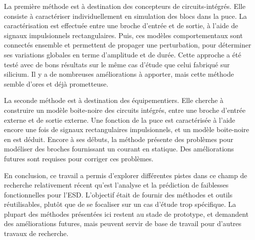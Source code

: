 La première méthode est à destination des concepteurs de circuits-intégrés.
Elle consiste à caractériser individuellement en simulation des blocs dans la puce.
La caractérisation est effectuée entre une broche d'entrée et de sortie, à l'aide de signaux impulsionnels rectangulaires.
Puis, ces modèles comportementaux sont connectés ensemble et permettent de propager une perturbation, pour déterminer ses variations globales en terme d'amplitude et de durée.
Cette approche a été testé avec de bons résultats sur le même cas d'étude que celui fabriqué sur silicium.
Il y a de nombreuses améliorations à apporter, mais cette méthode semble d'ores et déjà prometteuse.

La seconde méthode est à destination des équipementiers.
Elle cherche à construire un modèle boite-noire des circuits intégrés, entre une broche d'entrée externe et de sortie externe.
Une fonction de la puce est caractérisée à l'aide encore une fois de signaux rectangulaires impulsionnels, et un modèle boite-noire en est déduit.
Encore à ses débuts, la méthode présente des problèmes pour modéliser des broches fournissant un courant en statique.
Des améliorations futures sont requises pour corriger ces problèmes.

En conclusion, ce travail a permis d'explorer différentes pistes dans ce champ de recherche relativement récent qu'est l'analyse et la prédiction de faiblesses fonctionnelles pour l'ESD.
L'objectif était de fournir des méthodes et outils réutilisables, plutôt que de se focaliser sur un cas d'étude trop spécifique.
La plupart des méthodes présentées ici restent au stade de prototype, et demandent des améliorations futures, mais peuvent servir de base de travail pour d'autres travaux de recherche.
